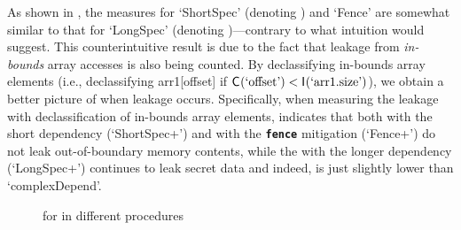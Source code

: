 As shown in , the
\JaccardRand{\secretsSetSize} measures for `ShortSpec' (denoting
) and `Fence' are somewhat similar
to that for `LongSpec' (denoting
)---contrary to what intuition
would suggest.  This
counterintuitive result is due to the fact that leakage from
\textit{in-bounds} array accesses is also being counted.  By
declassifying in-bounds array elements (i.e., declassifying
arr1[offset] if $\mathsf{C}_{}(\textrm{`offset'}) <
\mathsf{I}_{}(\textrm{`arr1.size'})$), we obtain a better picture of when
leakage occurs.  Specifically, when measuring the leakage with
declassification of in-bounds array elements,
\JaccardWithDeclass{\secretsSetSize} indicates that both \proc with
the short dependency (`ShortSpec+\declassify{}') and \proc with the
\texttt{\textbf{fence}} mitigation (`Fence+\declassify{}') do not leak
out-of-boundary memory contents, while the \proc with the longer
dependency (`LongSpec+\declassify{}') continues to leak secret data and
indeed, is just slightly lower than `complexDepend'.

\begin{figure}[t]
\centering
\resizebox{0.7\columnwidth}{!}{\protect\footnotesize}
\caption{\JaccardWithDeclass{\secretsSetSize} for \spectre in different procedures\label{fig:spectre:jaccard}}
\end{figure}

